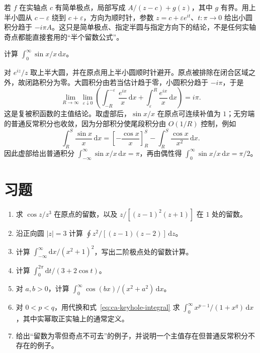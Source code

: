 若 $f$ 在实轴点 $c$ 有简单极点，局部写成 $A/(z-c)+g(z)$，其中 $g$ 有界。用上半小圆从 $c-\varepsilon$ 绕到 $c+\varepsilon$，方向为顺时针，参数 $z=c+\varepsilon e^{it}$、$t:\pi\to0$ 给出小圆积分趋于 $-i\pi A$。这只是简单极点、指定半圆与指定方向下的结论，不是任何实轴奇点都能直接套用的“半个留数公式”。

\begin{example}[狄利克雷积分]
\label{ex:ca-dirichlet}
计算 $\int_0^\infty\sin x/x\,\mathrm dx$。
\end{example}
\begin{solve}
对 $e^{iz}/z$ 取上半大圆，并在原点用上半小圆顺时针避开。原点被排除在闭合区域之外，故闭路积分为零。大圆积分由若当估计趋于零，小圆积分趋于 $-i\pi$，于是
\[
 \lim_{R\to\infty}\lim_{\varepsilon\downarrow0}
 \left(\int_{-R}^{-\varepsilon}\frac{e^{ix}}x\,\mathrm dx
 +\int_\varepsilon^R\frac{e^{ix}}x\,\mathrm dx\right)=i\pi.
\]
这是复被积函数的主值结论。取虚部后，$\sin x/x$ 在原点可连续补值为 $1$；无穷端的普通反常积分也收敛，因为分部积分使尾段积分由 $O(1/R)$ 控制，例如
\[
 \int_R^S\frac{\sin x}{x}\,\mathrm dx
 =\left[-\frac{\cos x}{x}\right]_R^S
 -\int_R^S\frac{\cos x}{x^2}\,\mathrm dx.
\]
因此虚部给出普通积分 $\int_{-\infty}^{\infty}\sin x/x\,\mathrm dx=\pi$，再由偶性得 $\int_0^\infty\sin x/x\,\mathrm dx=\pi/2$。
\end{solve}

\section{习题}
\label{sec:ca-residue-ex}
\begin{enumerate}
 \item 求 $\cos z/z^3$ 在原点的留数，以及 $z/[(z-1)^2(z+1)]$ 在 $1$ 处的留数。
 \item 沿正向圆 $|z|=3$ 计算 $\oint z^2/[(z-1)(z-2)]\,\mathrm dz$。
 \item 计算 $\int_{-\infty}^{\infty}\mathrm dx/(x^2+1)^2$，写出二阶极点处的留数计算。
 \item 计算 $\int_0^{2\pi}\mathrm dt/(3+2\cos t)$。
 \item 对 $a,b>0$，计算 $\int_0^\infty\cos(bx)/(x^2+a^2)\,\mathrm dx$。
 \item 对 $0<p<q$，用代换和式~\eqref{eq:ca-keyhole-integral} 求 $\int_0^\infty x^{p-1}/(1+x^q)\,\mathrm dx$，其中实幂取正实轴上的通常定义。
 \item 给出“留数为零但奇点不可去”的例子，并说明一个主值存在但普通反常积分不存在的例子。
\end{enumerate}

